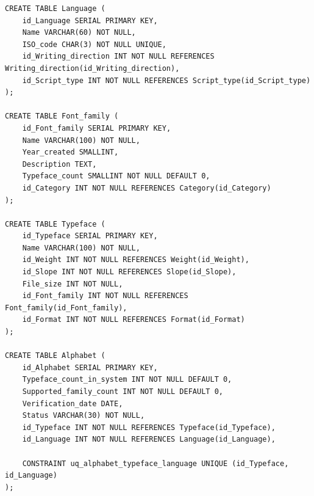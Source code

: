 \begin{verbatim}
CREATE TABLE Language (
    id_Language SERIAL PRIMARY KEY,
    Name VARCHAR(60) NOT NULL,
    ISO_code CHAR(3) NOT NULL UNIQUE,
    id_Writing_direction INT NOT NULL REFERENCES Writing_direction(id_Writing_direction),
    id_Script_type INT NOT NULL REFERENCES Script_type(id_Script_type)
);

CREATE TABLE Font_family (
    id_Font_family SERIAL PRIMARY KEY,
    Name VARCHAR(100) NOT NULL,
    Year_created SMALLINT,
    Description TEXT,
    Typeface_count SMALLINT NOT NULL DEFAULT 0,
    id_Category INT NOT NULL REFERENCES Category(id_Category)
);

CREATE TABLE Typeface (
    id_Typeface SERIAL PRIMARY KEY,
    Name VARCHAR(100) NOT NULL,
    id_Weight INT NOT NULL REFERENCES Weight(id_Weight),
    id_Slope INT NOT NULL REFERENCES Slope(id_Slope),
    File_size INT NOT NULL,
    id_Font_family INT NOT NULL REFERENCES Font_family(id_Font_family),
    id_Format INT NOT NULL REFERENCES Format(id_Format)
);

CREATE TABLE Alphabet (
    id_Alphabet SERIAL PRIMARY KEY,
    Typeface_count_in_system INT NOT NULL DEFAULT 0,
    Supported_family_count INT NOT NULL DEFAULT 0,
    Verification_date DATE,
    Status VARCHAR(30) NOT NULL,
    id_Typeface INT NOT NULL REFERENCES Typeface(id_Typeface),
    id_Language INT NOT NULL REFERENCES Language(id_Language),

    CONSTRAINT uq_alphabet_typeface_language UNIQUE (id_Typeface, id_Language)
);
\end{verbatim}
